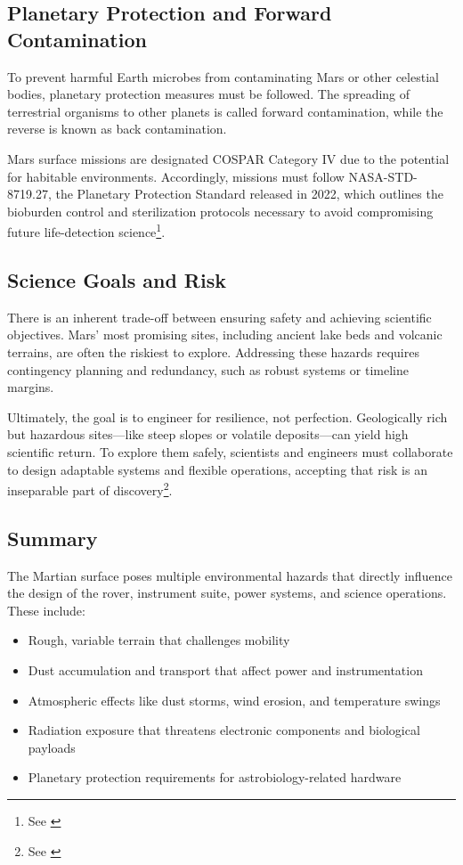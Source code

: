 \subsection*{Planetary Protection and Forward Contamination}

To prevent harmful Earth microbes from contaminating Mars or other celestial bodies, planetary protection measures must be followed. The spreading of terrestrial organisms to other planets is called forward contamination, while the reverse is known as back contamination.

Mars surface missions are designated COSPAR Category IV due to the potential for habitable environments. Accordingly, missions must follow NASA-STD-8719.27, the Planetary Protection Standard released in 2022, which outlines the bioburden control and sterilization protocols necessary to avoid compromising future life-detection science\footnote{See \cite{nasa_sma_2022_protection}}.

\subsection*{Science Goals and Risk}

There is an inherent trade-off between ensuring safety and achieving scientific objectives. Mars’ most promising sites, including ancient lake beds and volcanic terrains, are often the riskiest to explore. Addressing these hazards requires contingency planning and redundancy, such as robust systems or timeline margins.

Ultimately, the goal is to engineer for resilience, not perfection. Geologically rich but hazardous sites—like steep slopes or volatile deposits—can yield high scientific return. To explore them safely, scientists and engineers must collaborate to design adaptable systems and flexible operations, accepting that risk is an inseparable part of discovery\footnote{See \cite{nasa_2019_env_hazards}}.

\subsection*{Summary}

The Martian surface poses multiple environmental hazards that directly influence the design of the rover, instrument suite, power systems, and science operations. These include:

\begin{itemize}
    \item Rough, variable terrain that challenges mobility
    \item Dust accumulation and transport that affect power and instrumentation
    \item Atmospheric effects like dust storms, wind erosion, and temperature swings
    \item Radiation exposure that threatens electronic components and biological payloads
    \item Planetary protection requirements for astrobiology-related hardware
\end{itemize}

